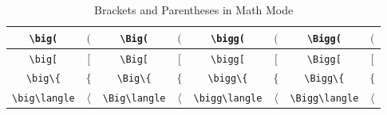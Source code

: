 \begin{table}
\caption{Brackets and Parentheses in Math Mode}
\begin{center}
\begin{tabular}{|c|c|c|c|c|c|c|c|} \hline
\verb"\big(" & $\big($ & \verb"\Big(" & $\Big($ & \verb"\bigg(" & $\bigg($ & \verb"\Bigg(" & $\Bigg($ \bigstrut \\ \hline
\verb"\big[" & $\big[$ & \verb"\Big[" & $\Big[$ & \verb"\bigg[" & $\bigg[$ & \verb"\Bigg[" & $\Bigg[$ \bigstrut \\ \hline
\verb"\big\{" & $\big\{$ & \verb"\Big\{" & $\Big\{$ & \verb"\bigg\{" & $\bigg\{$ & \verb"\Bigg\{" & $\Bigg\{$ \bigstrut \\ \hline
\verb"\big\langle" & $\big\langle$ & \verb"\Big\langle" & $\Big\langle$ & \verb"\bigg\langle" & $\bigg\langle$ & \verb"\Bigg\langle" & $\Bigg\langle$ \bigstrut \\ \hline
\end{tabular}
\end{center}
\label{tab_math_4}
\end{table}







